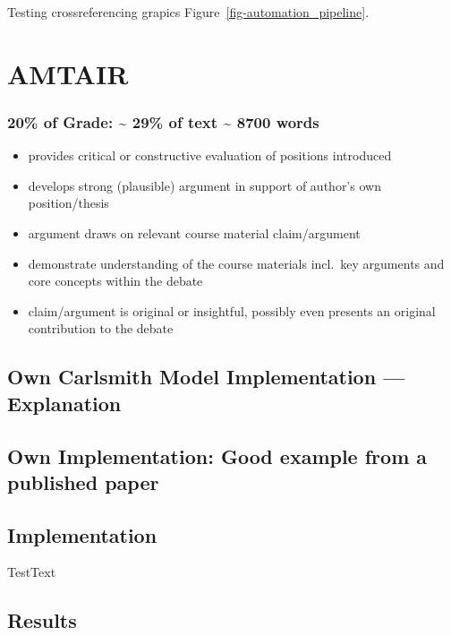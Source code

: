 \documentclass[
  letterpaper,
]{book}
\providecommand{\tightlist}{%
  \setlength{\itemsep}{0pt}\setlength{\parskip}{0pt}}
\begin{document}
Testing crossreferencing grapics Figure~\ref{fig-automation_pipeline}.


\chapter{AMTAIR}\label{amtair}

\subsection{20\% of Grade: \textasciitilde{} 29\% of text
\textasciitilde{} 8700 words}\label{of-grade-29-of-text-8700-words}

\begin{itemize}
\tightlist
\item
  provides critical or constructive evaluation of positions introduced
\item
  develops strong (plausible) argument in support of author's own
  position/thesis
\item
  argument draws on relevant course material claim/argument
\item
  demonstrate understanding of the course materials incl.~key arguments
  and core concepts within the debate
\item
  claim/argument is original or insightful, possibly even presents an
  original contribution to the debate
\end{itemize}

\section{Own Carlsmith Model Implementation ---
Explanation}\label{own-carlsmith-model-implementation-explanation}

\section{Own Implementation: Good example from a published
paper}\label{own-implementation-good-example-from-a-published-paper}

\section{Implementation}\label{implementation}

TestText

\section{Results}\label{results}
\end{document}

